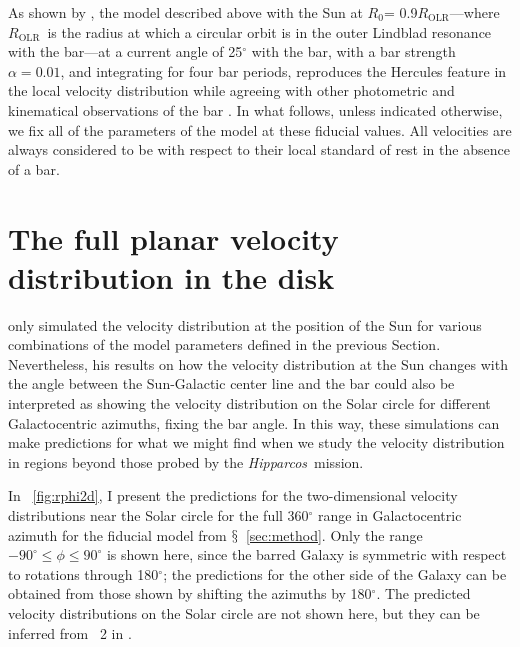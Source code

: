 \documentclass[12pt,preprint]{aastex}
\newcommand{\eg}{e.g.}
\newcommand{\sectionname}{$\mathsection$}
\newcommand{\hipparcos}{\emph{Hipparcos}}
\newcommand{\Ro}{\ensuremath{R_0}}
\newcommand{\Rolr}{\ensuremath{R_{\text{OLR}}}}
\begin{document}
As shown by \citet{dehnen99c,dehnen00a}, the model described above
with the Sun at \Ro = 0.9\Rolr---where \Rolr\ is the radius at which a
circular orbit is in the outer Lindblad resonance with the bar---at a
current angle of 25$^{\circ}$ with the bar, with a bar strength
$\alpha = 0.01$, and integrating for four bar periods, reproduces the
Hercules feature in the local velocity distribution while agreeing
with other photometric and kinematical observations of the bar
\citep[\eg,][]{binney97a,bissantz02a,cole02a,Shen10a}. In what
follows, unless indicated otherwise, we fix all of the parameters of
the model at these fiducial values. All velocities are always
considered to be with respect to their local standard of rest in the
absence of a bar.

\section{The full planar velocity distribution in the disk}\label{sec:2d}

\citet{dehnen00a} only simulated the velocity distribution at the
position of the Sun for various combinations of the model parameters
defined in the previous Section. Nevertheless, his results on how the
velocity distribution at the Sun changes with the angle between the
Sun-Galactic center line and the bar could also be interpreted as
showing the velocity distribution on the Solar circle for different
Galactocentric azimuths, fixing the bar angle. In this way, these
simulations can make predictions for what we might find when we study
the velocity distribution in regions beyond those probed by the
\hipparcos\ mission.

In \figurename~\ref{fig:rphi2d}, I present the predictions for the
two-dimensional velocity distributions near the Solar circle for the
full 360$^{\circ}$ range in Galactocentric azimuth for the fiducial
model from \sectionname~\ref{sec:method}. Only the range $-90^{\circ}
\leq \phi \leq 90^{\circ}$ is shown here, since the barred Galaxy is
symmetric with respect to rotations through 180$^{\circ}$; the
predictions for the other side of the Galaxy can be obtained from
those shown by shifting the azimuths by 180$^{\circ}$. The predicted
velocity distributions on the Solar circle are not shown here, but
they can be inferred from \figurename~2 in \citet{dehnen00a}.
\end{document}

